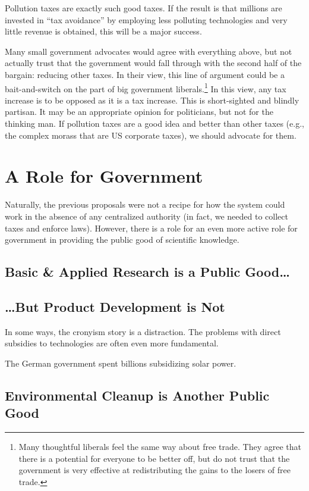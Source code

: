 Pollution taxes are exactly such good taxes. If the result is that millions are
invested in ``tax avoidance'' by employing less polluting technologies and very
little revenue is obtained, this will be a major success.

Many small government advocates would agree with everything above, but not
actually trust that the government would fall through with the second half of
the bargain: reducing other taxes. In their view, this line of argument could
be a bait-and-switch on the part of big government liberals.\footnote{Many
thoughtful liberals feel the same way about free trade. They agree that there
is a potential for everyone to be better off, but do not trust that the
government is very effective at redistributing the gains to the losers of free
trade.} In this view, any tax increase is to be opposed as it is a tax
increase. This is short-sighted and blindly partisan. It may be an appropriate
opinion for politicians, but not for the thinking man. If pollution taxes are a
good idea and better than other taxes (e.g., the complex morass that are US
corporate taxes), we should advocate for them.

\section{A Role for Government}

Naturally, the previous proposals were not a recipe for how the system could
work in the absence of any centralized authority (in fact, we needed to collect
taxes and enforce laws). However, there is a role for an even more active role
for government in providing the public good of scientific knowledge.

\subsection{Basic \& Applied Research is a Public Good\ldots}

\subsection{\ldots But Product Development is Not}

In some ways, the cronyism story is a distraction. The problems with direct
subsidies to technologies are often even more fundamental.

The German government spent billions subsidizing solar power.

\subsection{Environmental Cleanup is Another Public Good}

